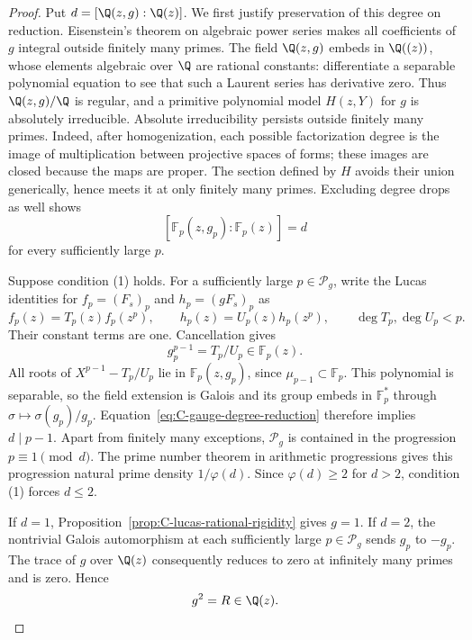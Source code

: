 \begin{proof}
Put $d=[\Q(z,g):\Q(z)]$. We first justify preservation of this degree
on reduction. Eisenstein's theorem on algebraic power series makes
all coefficients of $g$ integral outside finitely many primes.
The field $\Q(z,g)$ embeds in $\Q((z))$, whose elements algebraic
over $\Q$ are rational constants: differentiate a separable polynomial
equation to see that such a Laurent series has derivative zero.
Thus $\Q(z,g)/\Q$ is regular, and a primitive polynomial model
$H(z,Y)$ for $g$ is absolutely irreducible.
Absolute irreducibility persists outside finitely many primes.
Indeed, after homogenization, each possible factorization degree
is the image of multiplication between projective spaces of forms;
these images are closed because the maps are proper. The section
defined by $H$ avoids their union generically, hence meets it at
only finitely many primes. Excluding degree drops as well shows
\begin{equation}\label{eq:C-gauge-degree-reduction}
 [\mathbb F_p(z,g_p):\mathbb F_p(z)]=d
\end{equation}
for every sufficiently large $p$.

Suppose condition (1) holds. For a sufficiently large $p\in\mathcal P_g$,
write the Lucas identities for $f_p=(F_s)_p$ and $h_p=(gF_s)_p$ as
\[
 f_p(z)=T_p(z)f_p(z^p),\qquad
 h_p(z)=U_p(z)h_p(z^p),\qquad \deg T_p,\deg U_p<p.
\]
Their constant terms are one. Cancellation gives
\begin{equation}\label{eq:C-algebraic-gauge-kummer}
 g_p^{p-1}=T_p/U_p\in\mathbb F_p(z).
\end{equation}
All roots of $X^{p-1}-T_p/U_p$ lie in $\mathbb F_p(z,g_p)$,
since $\mu_{p-1}\subset\mathbb F_p$. This polynomial is separable,
so the field extension is Galois and its group embeds in
$\mathbb F_p^*$ through $\sigma\mapsto\sigma(g_p)/g_p$.
Equation~\eqref{eq:C-gauge-degree-reduction} therefore implies
$d\mid p-1$. Apart from finitely many exceptions,
$\mathcal P_g$ is contained in the progression $p\equiv1\pmod d$.
The prime number theorem in arithmetic progressions gives this
progression natural prime density $1/\varphi(d)$.
Since $\varphi(d)\geq2$ for $d>2$, condition (1) forces $d\leq2$.

If $d=1$, Proposition~\ref{prop:C-lucas-rational-rigidity} gives $g=1$.
If $d=2$, the nontrivial Galois automorphism at each sufficiently
large $p\in\mathcal P_g$ sends $g_p$ to $-g_p$.
The trace of $g$ over $\Q(z)$ consequently reduces to zero at
infinitely many primes and is zero. Hence
\[
                         g^2=R\in\Q(z).
\]


\end{proof}
